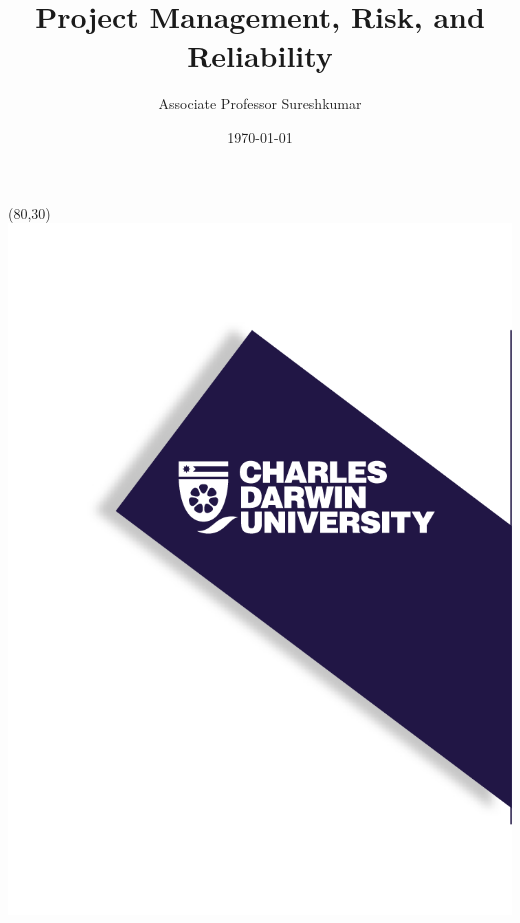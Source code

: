 \documentclass{beamer}
\title[PRT551 - Lecture 3]{Project Management, Risk, and Reliability} %
\author{Associate Professor Sureshkumar} %
\institute[CDU] %
{
Charles Darwin University \\ %
\medskip
\textit{cdux@cdu.edu.au} %
}
\date{\today} %
\begin{document}
\begin{frame}
\titlepage %
\begin{textblock}{20}(80,30)
      \includegraphics[scale=0.8]{logo_1.png}
\end{textblock}
\end{frame}



\end{document}
